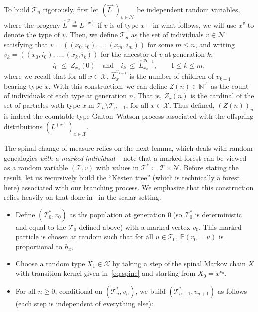 \begin{refsegment}
To build $\mathcal{T}_{ n}$ rigorously, first let $(\hat{L}^{v})_{v\in \mathcal{N}}$ be independent random variables, where the progeny $\hat{L}^{v}\overset{d}{=}L^{(x)}$ if $v$ is of type $x$ -- in what follows, we will use $x^v$ to denote the type of $v$.
Then, we define $\mathcal{T}_{ n}$ as the set of individuals $v\in \mathcal{N}$ satisfying that $v=((x_0,i_0),\ldots,(x_m,i_m))$ for some $m\leq n$, and writing $v_k=((x_0,i_0),\ldots,(x_k,i_k))$ for the ancestor of $v$ at generation $k$:
\[
  i_0\ \leq\ Z_{x_0}(0) \quad \text{and} \quad i_{k} \ \leq\ \hat{L}^{v_{k-1}}_{x_k}, \qquad 1\leq k \leq m,
\]
where we recall that for all $x\in\mathcal{X},\ \hat{L}^{v_{k-1}}_{x}$ is the number of children of $v_{k-1}$ bearing type $x$. 
With this construction, we can define $Z(n)\in \mathbb{N}^{\mathcal{X}}$ as the count of individuals of each type at generation $n$. That is, $Z_x(n)$ is the cardinal of the set of particles with type $x$ in $
\mathcal{T}_{ n}\setminus \mathcal{T}_{ n-1}$, for all $x\in \mathcal{X}$.
Thus defined, $(Z(n))_n$ is indeed the countable-type Galton--Watson process associated with the offspring distributions $(L^{(x)})_{x\in \mathcal{X}}$.

The spinal change of measure relies on the next lemma, which deals with random genealogies \emph{with a marked individual} -- note that a marked forest can be viewed as a random variable $(\mathcal{T},v)$ with values in $\mathscr{T}^*\coloneqq\mathscr{T}\times \mathcal{N}$. 
Before stating the result, let us recursively build the ``Kesten tree'' (which is technically a forest here) associated with our branching process. We emphasize that this construction relies heavily on that done in~\cite{lyons_pemantle_peres_1995} in the scalar setting.
\begin{itemize}
  \item Define $(\mathcal{T}^{*}_0, v_0)$ as the population at generation $0$ (so $\mathcal{T}^{*}_0$ is deterministic and equal to the $\mathcal{T}_0$ defined above) with a marked vertex $v_0$. This marked particle is chosen at random 
  such that for all $u\in \mathcal{T}_0$, $\mathbb{P}(v_0=u)$ is proportional to $h_{x^u}$.
 
 \item Choose a random type $X_{1}\in \mathcal{X}$ by taking a step of the spinal Markov chain $X$ with transition kernel given in~\eqref{eq:spine} and starting from $X_0=x^{v_0}$.
  \item For all $n\geq 0$, conditional on $(\mathcal{T}^{*}_{ n}, v_n)$, we build $(\mathcal{T}^{*}_{ n+1}, v_{n+1})$ as follows (each step is independent of everything else):
  \begin{itemize}


\end{itemize}
\end{itemize}
\end{refsegment}
